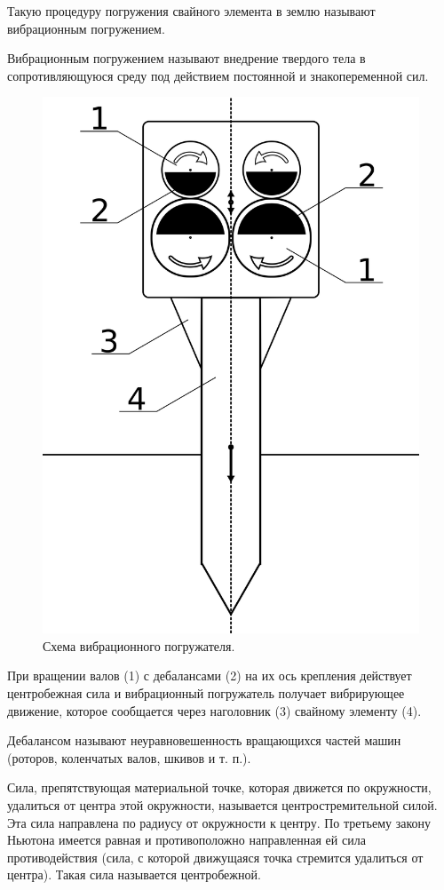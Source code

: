 Такую процедуру погружения свайного элемента в землю называют вибрационным погружением.

\begin{definition}
    Вибрационным погружением называют внедрение твердого тела в сопротивляющуюся среду под действием постоянной и знакопеременной сил.
\end{definition}

\begin{figure}[h]
    \centering
    \includegraphics[width=0.5\linewidth]{img/scheme_porg_2.png}
    \caption{Схема вибрационного погружателя.}
    \label{fig:scheme_porg}
\end{figure}

При вращении валов (1) с дебалансами (2) на их ось крепления действует центробежная сила и вибрационный погружатель получает вибрирующее движение,
которое сообщается через наголовник (3) свайному элементу (4).

\begin{definition}
    Дебалансом называют неуравновешенность вращающихся частей машин (роторов, коленчатых валов, шкивов и т. п.).
\end{definition}

\begin{definition}
    Сила, препятствующая материальной точке, которая движется по окружности, удалиться от центра этой окружности,
    называется центростремительной силой. Эта сила направлена по радиусу от окружности к центру.
    По третьему закону Ньютона имеется равная и противоположно направленная ей сила противодействия
    (сила, с которой движущаяся точка стремится удалиться от центра). Такая сила называется центробежной.
\end{definition}

